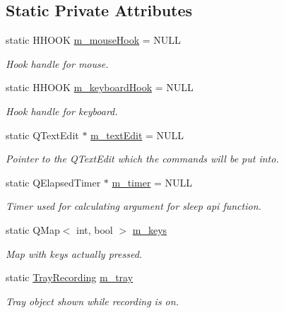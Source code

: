 \subsection*{Static Private Attributes}
\begin{DoxyCompactItemize}
\item 
static H\-H\-O\-O\-K \hyperlink{class_recorder_afc492637af50f03afea3ee346097bef5}{m\-\_\-mouse\-Hook} = N\-U\-L\-L
\begin{DoxyCompactList}\small\item\em Hook handle for mouse. \end{DoxyCompactList}\item 
static H\-H\-O\-O\-K \hyperlink{class_recorder_ac75a3adc936900eeba379048a2622215}{m\-\_\-keyboard\-Hook} = N\-U\-L\-L
\begin{DoxyCompactList}\small\item\em Hook handle for keyboard. \end{DoxyCompactList}\item 
static Q\-Text\-Edit $\ast$ \hyperlink{class_recorder_a738be0679e1861350cf20e4c7fe0a8af}{m\-\_\-text\-Edit} = N\-U\-L\-L
\begin{DoxyCompactList}\small\item\em Pointer to the Q\-Text\-Edit which the commands will be put into. \end{DoxyCompactList}\item 
static Q\-Elapsed\-Timer $\ast$ \hyperlink{class_recorder_adb205651c105efc4d6a938be11df443f}{m\-\_\-timer} = N\-U\-L\-L
\begin{DoxyCompactList}\small\item\em Timer used for calculating argument for sleep api function. \end{DoxyCompactList}\item 
static Q\-Map$<$ int, bool $>$ \hyperlink{class_recorder_ae73e169cfea87f1de570875fd2ed79de}{m\-\_\-keys}
\begin{DoxyCompactList}\small\item\em Map with keys actually pressed. \end{DoxyCompactList}\item 
static \hyperlink{class_tray_recording}{Tray\-Recording} \hyperlink{class_recorder_a0377d9a823426d32738d6d8153b59d60}{m\-\_\-tray}
\begin{DoxyCompactList}\small\item\em Tray object shown while recording is on. \end{DoxyCompactList}\item 

\end{DoxyCompactItemize}
